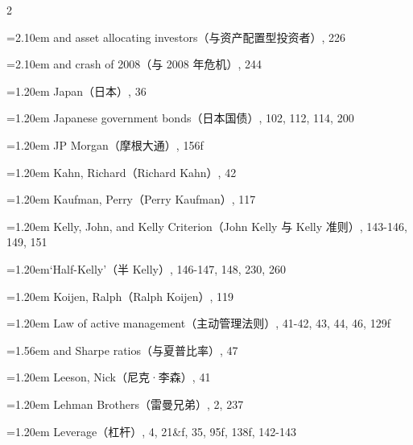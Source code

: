 {\begin{multicols}{2}
\par \noindent\hangindent=2.10em\hspace*{0.90em} and asset allocating investors（与资产配置型投资者）, 226
\par \noindent\hangindent=2.10em\hspace*{0.90em} and crash of 2008（与 2008 年危机）, 244
\par \noindent\hangindent=1.20em\hspace*{0.00em} Japan（日本）, 36
\par \noindent\hangindent=1.20em\hspace*{0.00em} Japanese government bonds（日本国债）, 102, 112, 114, 200
\par \noindent\hangindent=1.20em\hspace*{0.00em} JP Morgan（摩根大通）, 156f
\par \noindent\hangindent=1.20em\hspace*{0.00em} Kahn, Richard（Richard Kahn）, 42
\par \noindent\hangindent=1.20em\hspace*{0.00em} Kaufman, Perry（Perry Kaufman）, 117
\par \noindent\hangindent=1.20em\hspace*{0.00em} Kelly, John, and Kelly Criterion（John Kelly 与 Kelly 准则）, 143-146, 149, 151
\par \noindent\hangindent=1.20em\hspace*{0.00em}‘Half-Kelly’（半 Kelly）, 146-147, 148, 230, 260
\par \noindent\hangindent=1.20em\hspace*{0.00em} Koijen, Ralph（Ralph Koijen）, 119
\par \noindent\hangindent=1.20em\hspace*{0.00em} Law of active management（主动管理法则）, 41-42, 43, 44, 46, 129f
\par \noindent\hangindent=1.56em\hspace*{0.36em} and Sharpe ratios（与夏普比率）, 47
\par \noindent\hangindent=1.20em\hspace*{0.00em} Leeson, Nick（尼克·李森）, 41
\par \noindent\hangindent=1.20em\hspace*{0.00em} Lehman Brothers（雷曼兄弟）, 2, 237
\par \noindent\hangindent=1.20em\hspace*{0.00em} Leverage（杠杆）, 4, 21\&f, 35, 95f, 138f, 142-143

\end{multicols}}
